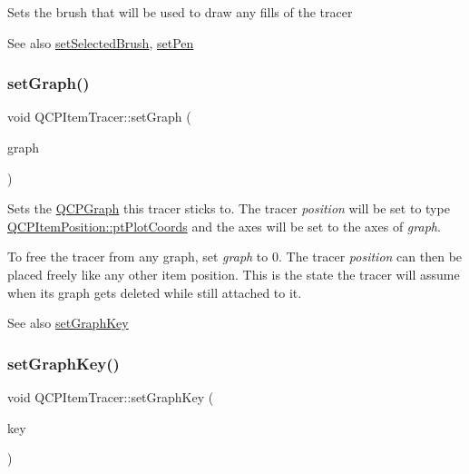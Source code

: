 Sets the brush that will be used to draw any fills of the tracer

\begin{DoxySeeAlso}{See also}
\hyperlink{class_q_c_p_item_tracer_a0f55c084980a7a312af859d3e7b558ef}{set\+Selected\+Brush}, \hyperlink{class_q_c_p_item_tracer_af8048636fc1ef0152e51809b008df2ca}{set\+Pen} 
\end{DoxySeeAlso}
\mbox{\label{class_q_c_p_item_tracer_af5886f4ded8dd68cb4f3388f390790c0}} 
\subsubsection{\texorpdfstring{set\+Graph()}{setGraph()}}
{\footnotesize\ttfamily void Q\+C\+P\+Item\+Tracer\+::set\+Graph (\begin{DoxyParamCaption}\item[{\hyperlink{class_q_c_p_graph}{Q\+C\+P\+Graph} $\ast$}]{graph }\end{DoxyParamCaption})}

Sets the \hyperlink{class_q_c_p_graph}{Q\+C\+P\+Graph} this tracer sticks to. The tracer {\itshape position} will be set to type \hyperlink{class_q_c_p_item_position_aad9936c22bf43e3d358552f6e86dbdc8ad5ffb8dc99ad73263f7010c77342294c}{Q\+C\+P\+Item\+Position\+::pt\+Plot\+Coords} and the axes will be set to the axes of {\itshape graph}.

To free the tracer from any graph, set {\itshape graph} to 0. The tracer {\itshape position} can then be placed freely like any other item position. This is the state the tracer will assume when its graph gets deleted while still attached to it.

\begin{DoxySeeAlso}{See also}
\hyperlink{class_q_c_p_item_tracer_a6840143b42f3b685cedf7c6d83a704c8}{set\+Graph\+Key} 
\end{DoxySeeAlso}
\mbox{\label{class_q_c_p_item_tracer_a6840143b42f3b685cedf7c6d83a704c8}} 
\subsubsection{\texorpdfstring{set\+Graph\+Key()}{setGraphKey()}}
{\footnotesize\ttfamily void Q\+C\+P\+Item\+Tracer\+::set\+Graph\+Key (\begin{DoxyParamCaption}\item[{double}]{key }\end{DoxyParamCaption})}

